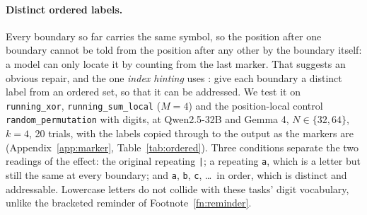 \documentclass[10pt]{article} %
\newcommand{\task}[1]{\texttt{#1}}
\begin{document}
\paragraph{Distinct ordered labels.} Every boundary so far carries the same symbol, so the position after one boundary cannot be told from the position after any other by the boundary itself: a model can only locate it by counting from the last marker. That suggests an obvious repair, and the one \emph{index hinting} uses \citep{zhou2024algorithms}: give each boundary a distinct label from an ordered set, so that it can be addressed. We test it on \task{running\_xor}, \task{running\_sum\_local} ($M = 4$) and the position-local control \task{random\_permutation} with digits, at Qwen2.5-32B and Gemma 4, $N \in \{32, 64\}$, $k = 4$, 20 trials, with the labels copied through to the output as the markers are (Appendix~\ref{app:marker}, Table~\ref{tab:ordered}). Three conditions separate the two readings of the effect: the original repeating \texttt{|}; a repeating \texttt{a}, which is a letter but still the same at every boundary; and \texttt{a}, \texttt{b}, \texttt{c}, \ldots\ in order, which is distinct and addressable. Lowercase letters do not collide with these tasks' digit vocabulary, unlike the bracketed reminder of Footnote~\ref{fn:reminder}.
\end{document}
